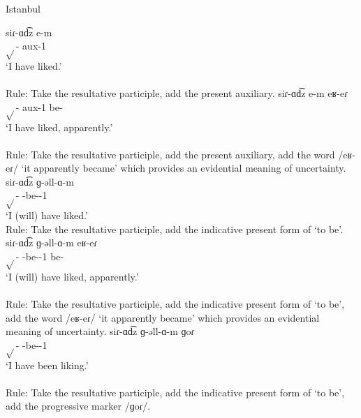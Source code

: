 

\begin{exe}
	\ex Istanbul \label{sent:Istanbul:morpho:verb:complex:resultpart} 
	\begin{xlist}
		\ex \gll siɾ-ɑd͡z e-m \\
		$\sqrt{}$-{\rptcp} {aux}-1{\sg}\\
		\trans `I have liked.'\\
		 \\
		Rule: Take the resultative participle, add the present auxiliary.
		\ex \gll siɾ-ɑd͡z e-m eʁ-eɾ \\
		$\sqrt{}$-{\rptcp} {aux}-1{\sg} be-{\eptcp} \\
		\trans `I have liked, apparently.' \\
		 \\
		Rule: Take the resultative participle, add the present auxiliary, add the word /eʁ-eɾ/ `it apparently became' which provides an evidential meaning of uncertainty.
		\ex \gll siɾ-ɑd͡z ɡ-əll-ɑ-m \\
		$\sqrt{}$-{\rptcp} {\ind}-be-{\thgloss}-1{\sg} \\
		\trans `I (will) have liked.'
		 \\
		Rule: Take the resultative participle, add the indicative present form of `to be'.
		\ex \gll siɾ-ɑd͡z ɡ-əll-ɑ-m eʁ-eɾ \\
		$\sqrt{}$-{\rptcp} {\ind}-be-{\thgloss}-1{\sg} be-{\eptcp}\\
		\trans `I (will) have liked, apparently.' \\
		 \\
		Rule: Take the resultative participle, add the indicative present form of `to be', add the word /eʁ-eɾ/ `it apparently became' which provides an evidential meaning of uncertainty.
		\ex \gll siɾ-ɑd͡z ɡ-əll-ɑ-m ɡoɾ \\
		$\sqrt{}$-{\rptcp} {\ind}-be-{\thgloss}-1{\sg} {\prog} \\
		\trans `I have been liking.' \\
		 \\
		Rule: Take the resultative participle, add the indicative present form of `to be', add the progressive marker /ɡoɾ/. 
		

\end{xlist}
\end{exe}
